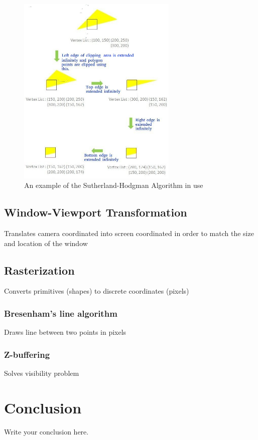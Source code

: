\documentclass{article}
\begin{document}
\begin{figure}
    \centering
    \includegraphics[width=3.0in]{Sutherland-Hodgman-Example.jpg}
    \caption{An example of the Sutherland-Hodgman Algorithm in use}
    \label{Sutherland-Hodgman}
\end{figure}

\subsection{Window-Viewport Transformation}
Translates camera coordinated into screen coordinated in order to match the size and location of the window

\subsection{Rasterization}
Converts primitives (shapes) to discrete coordinates (pixels)

\subsubsection{Bresenham's line algorithm}
Draws line between two points in pixels

\subsubsection{Z-buffering}
Solves visibility problem
\section{Conclusion}
Write your conclusion here.
\end{document}
